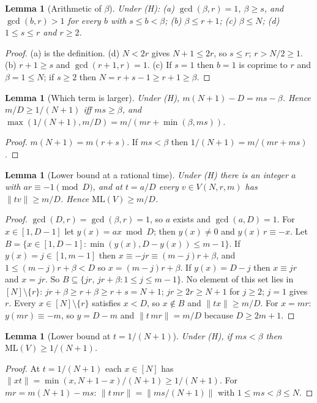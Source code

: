 \documentclass[11pt]{article}
\newtheorem{lemma}[theorem]{Lemma}
\theoremstyle{definition}
\theoremstyle{remark}
\newcommand{\nd}[1]{\lVert #1\rVert}
\newcommand{\ML}{\mathrm{ML}}
\begin{document}
\begin{lemma}[Arithmetic of $\beta$]\label{lem:beta}
Under (H): (a) $\gcd(\beta,r)=1$, $\beta\ge s$, and $\gcd(b,r)>1$ for every $b$ with $s\le b<\beta$; (b) $\beta\le r+1$; (c) $\beta\le N$; (d) $1\le s\le r$ and $r\ge2$.
\end{lemma}
\begin{proof}
(a) is the definition. (d) $N<2r$ gives $N+1\le2r$, so $s\le r$; $r>N/2\ge1$. (b) $r+1\ge s$ and $\gcd(r+1,r)=1$. (c) If $s=1$ then $b=1$ is coprime to $r$ and $\beta=1\le N$; if $s\ge2$ then $N=r+s-1\ge r+1\ge\beta$.
\end{proof}

\begin{lemma}[Which term is larger]\label{lem:zero}
Under (H), $m(N+1)-D=ms-\beta$. Hence $m/D\ge1/(N+1)$ iff $ms\ge\beta$, and $\max(1/(N+1),m/D)=m/(mr+\min(\beta,ms))$.
\end{lemma}
\begin{proof}
$m(N+1)=m(r+s)$. If $ms<\beta$ then $1/(N+1)=m/(mr+ms)$.
\end{proof}

\begin{lemma}[Lower bound at a rational time]\label{lem:lowA}
Under (H) there is an integer $a$ with $ar\equiv-1\pmod D$, and at $t=a/D$ every $v\in V(N,r,m)$ has $\nd{tv}\ge m/D$. Hence $\ML(V)\ge m/D$.
\end{lemma}
\begin{proof}
$\gcd(D,r)=\gcd(\beta,r)=1$, so $a$ exists and $\gcd(a,D)=1$. For $x\in[1,D-1]$ let $y(x)=ax\bmod D$; then $y(x)\ne0$ and $y(x)\,r\equiv-x$. Let $B=\{x\in[1,D-1]:\min(y(x),D-y(x))\le m-1\}$. If $y(x)=j\in[1,m-1]$ then $x\equiv-jr\equiv(m-j)r+\beta$, and $1\le(m-j)r+\beta<D$ so $x=(m-j)r+\beta$. If $y(x)=D-j$ then $x\equiv jr$ and $x=jr$. So $B\subseteq\{jr,\,jr+\beta:1\le j\le m-1\}$. No element of this set lies in $[N]\setminus\{r\}$: $jr+\beta\ge r+\beta\ge r+s=N+1$; $jr\ge2r\ge N+1$ for $j\ge2$; $j=1$ gives $r$. Every $x\in[N]\setminus\{r\}$ satisfies $x<D$, so $x\notin B$ and $\nd{tx}\ge m/D$. For $x=mr$: $y(mr)\equiv-m$, so $y=D-m$ and $\nd{t\,mr}=m/D$ because $D\ge2m+1$.
\end{proof}

\begin{lemma}[Lower bound at $t=1/(N+1)$]\label{lem:lowB}
Under (H), if $ms<\beta$ then $\ML(V)\ge1/(N+1)$.
\end{lemma}
\begin{proof}
At $t=1/(N+1)$ each $x\in[N]$ has $\nd{xt}=\min(x,N+1-x)/(N+1)\ge1/(N+1)$. For $mr=m(N+1)-ms$: $\nd{t\,mr}=\nd{ms/(N+1)}$ with $1\le ms<\beta\le N$.
\end{proof}
\end{document}
